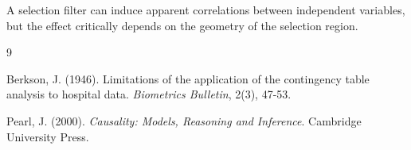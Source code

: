\documentclass[11pt]{article}
\begin{document}
A selection filter can induce apparent correlations between independent variables, but the effect critically depends on the geometry of the selection region.

\begin{thebibliography}{9}

Berkson, J. (1946). 
Limitations of the application of the contingency table analysis to hospital data. 
\textit{Biometrics Bulletin}, 2(3), 47-53.

Pearl, J. (2000). 
\textit{Causality: Models, Reasoning and Inference}. 
Cambridge University Press.

\end{thebibliography}
\end{document}
